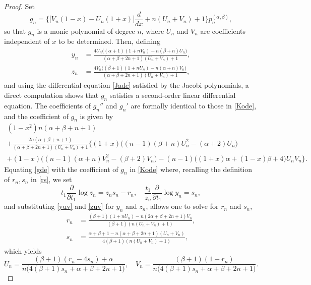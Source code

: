 \documentclass[10pt, reqno]{amsart}
\numberwithin{equation}{section}
\numberwithin{equation}{section}
\begin{document}
\begin{proof}
Set
\begin{equation}
g_n=\Big\{\big[V_n(1-x)-U_n(1+x)\big]\frac{d}{dx}+n(U_n+V_n)+1\Big\}p_n^{(\alpha,\beta)},\label{dK}
\end{equation}
so that $g_n$ is a monic polynomial of degree $n$, where $U_n$ and $V_n$ are coefficients independent of $x$ to be determined. Then, defining
\begin{align}
y_n&=\frac{4U_n\big((\alpha+1)(1+nV_n)-n(\beta+n)U_n\big)}{(\alpha+\beta+2n+1)(U_n+V_n)+1},\label{yuv}\\
z_n&=\frac{4V_n\big((\beta+1)(1+nU_n)-n(\alpha+n)V_n\big)}{(\alpha+\beta+2n+1)(U_n+V_n)+1},\label{zuv}
\end{align}
and using the differential equation \eqref{Jade} satisfied by the Jacobi polynomials, a direct computation shows that $g_n$ satisfies a second-order linear differential equation. The coefficients of $g_n''$ and $g_n'$ are formally identical to those in \eqref{Kode}, and the coefficient of $g_n$ is given by 
\begin{multline}
(1-x^2)n(\alpha+\beta+n+1)\\+\frac{2n(\alpha+\beta+n+1)}{(\alpha+\beta+2n+1)(U_n+V_n)+1}\Big\{(1+x)\big((n-1)(\beta+n)U_n^2-(\alpha+2)U_n\big)\\
+(1-x)\big((n-1)(\alpha+n)V_n^2-(\beta+2)V_n\big)-(n-1)\big((1+x)\alpha+(1-x)\beta+4\big)U_nV_n\Big\}.\label{gde}
\end{multline}
Equating \eqref{gde} with the coefficient of $g_n$ in \eqref{Kode} where, recalling the definition of $r_n,s_n$ in \eqref{rs}, we set
\begin{equation*}
t_1\frac{\partial}{\partial t_1}\log z_n=z_ns_n-r_n,\quad \frac{t_1}{z_n}\frac{\partial}{\partial t_1}\log y_n=s_n,
\end{equation*}
and substituting \eqref{yuv} and \eqref{zuv} for $y_n$ and $z_n$, allows one to solve for $r_n$ and $s_n$,
\begin{align*}
r_n&=\frac{(\beta+1)(1+nU_n)-n(2\alpha+\beta+2n+1)V_n}{(\beta+1)(n(U_n+V_n)+1)},\\
s_n&=\frac{\alpha+\beta+1-n(\alpha+\beta+2n+1)(U_n+V_n)}{4(\beta+1)(n(U_n+V_n)+1)},
\end{align*}
which yields 
\begin{equation}
U_n=\frac{(\beta+1)(r_n-4s_n)+\alpha}{n\big(4(\beta+1)s_n+\alpha+\beta+2n+1\big)},\quad
V_n=\frac{(\beta+1)(1-r_n)}{n\big(4(\beta+1)s_n+\alpha+\beta+2n+1\big)}.\label{guv}
\end{equation}

\end{proof}
\end{document}
